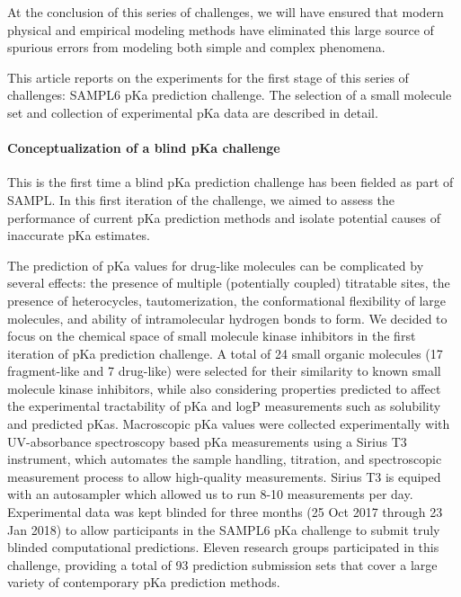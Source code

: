 \documentclass[9pt,lineno]{elife}
\begin{document}
At the conclusion of this series of challenges, we will have ensured that modern physical and empirical modeling methods have eliminated this large source of spurious errors from modeling both simple and complex phenomena.

This article reports on the experiments for the first stage of this series of challenges: SAMPL6 pKa prediction challenge. The selection of a small molecule set and collection of experimental pKa data are described in detail.

\paragraph{Conceptualization of a blind pKa challenge}

This is the first time a blind pKa prediction challenge has been fielded as part of SAMPL. 
In this first iteration of the challenge, we aimed to assess the performance of current pKa prediction methods and isolate potential causes of inaccurate pKa estimates.

The prediction of pKa values for drug-like molecules can be complicated by several effects: the presence of multiple (potentially coupled) titratable sites, the presence of heterocycles, tautomerization, the conformational flexibility of large molecules, and ability of intramolecular hydrogen bonds to form. 
We decided to focus on the chemical space of small molecule kinase inhibitors in the first iteration of pKa prediction challenge. 
A total of 24 small organic molecules (17 fragment-like and 7 drug-like) were selected for their similarity to known small molecule kinase inhibitors, while also considering properties predicted to affect the experimental tractability of pKa and logP measurements such as solubility and predicted pKas. 
Macroscopic pKa values were collected experimentally with UV-absorbance spectroscopy based pKa measurements using a Sirius T3 instrument, which automates the sample handling, titration, and spectroscopic measurement process to allow high-quality measurements. Sirius T3 is equiped with an autosampler which allowed us to run 8-10 measurements per day.
Experimental data was kept blinded for three months (25 Oct 2017 through 23 Jan 2018) to allow participants in the SAMPL6 pKa challenge to submit truly blinded computational predictions. 
Eleven research groups participated in this challenge, providing a total of 93 prediction submission sets that cover a large variety of contemporary pKa prediction methods. 
 
\end{document}
